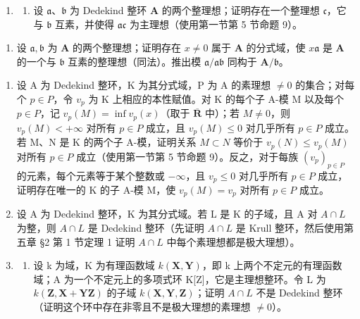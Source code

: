 \begin{enumerate}
\def\labelenumi{\arabic{enumi}.}
\setcounter{enumi}{1}
\tightlist
\item
  \begin{enumerate}
  \def\labelenumii{(\alph{enumii})}
  \tightlist
  \item
    设 \(\mathfrak{a}\)、\(\mathfrak{b}\) 为 Dedekind 整环 \(\mathbf{A}\) 的两个整理想；证明存在一个整理想 \(\mathfrak{c}\)，它与 \(\mathfrak{b}\) 互素，并使得 \(\mathfrak{ac}\) 为主理想（使用第一节第 5 节命题 9）。
  \end{enumerate}
\end{enumerate}

\begin{enumerate}
\def\labelenumi{(\alph{enumi})}
\setcounter{enumi}{1}
\tightlist
\item
  设 \(\mathfrak{a}, \mathfrak{b}\) 为 \(\mathbf{A}\) 的两个整理想；证明存在 \(x \neq 0\) 属于 \(\mathbf{A}\) 的分式域，使 \(x\mathfrak{a}\) 是 \(\mathbf{A}\) 的一个与 \(\mathfrak{b}\) 互素的整理想（同法）。推出模 \(\mathfrak{a}/\mathfrak{ab}\) 同构于 \(\mathbf{A}/\mathfrak{b}\)。
\end{enumerate}

\begin{enumerate}
\def\labelenumi{\arabic{enumi}.}
\setcounter{enumi}{2}
\item
  设 A 为 Dedekind 整环，K 为其分式域，P 为 A 的素理想 \(\neq 0\) 的集合；对每个 \(p \in P\)，令 \(v_{p}\) 为 K 上相应的本性赋值。对 K 的每个子 A-模 M 以及每个 \(p \in P\)，记 \(v_{p}(M) = \inf v_{p}(x)\)（取于 \(\overline{\mathbf{R}}\) 中）；若 \(M \neq 0\)，则 \(v_{p}(M) < +\infty\) 对所有 \(p \in P\) 成立，且 \(v_{p}(M) \leqslant 0\) 对几乎所有 \(p \in P\) 成立。若 M、N 是 K 的两个子 A-模，证明关系 \(M \subset N\) 等价于 \(v_{p}(N) \leqslant v_{p}(M)\) 对所有 \(p \in P\) 成立（使用第一节第 5 节命题 9）。反之，对于每族 \((v_{p})_{p \in P}\) 的元素，每个元素等于某个整数或 \(-\infty\)，且 \(v_{p} \leqslant 0\) 对几乎所有 \(p \in P\) 成立，证明存在唯一的 K 的子 A-模 M，使 \(v_{p}(M) = v_{p}\) 对所有 \(p \in P\) 成立。
\item
  设 A 为 Dedekind 整环，K 为其分式域。若 L 是 K 的子域，且 A 对 \(A \cap L\) 为整，则 \(A \cap L\) 是 Dedekind 整环（先证明 \(A \cap L\) 是 Krull 整环，然后使用第五章 §2 第 1 节定理 1 证明 \(A \cap L\) 中每个素理想都是极大理想）。
\item
  \begin{enumerate}
  \def\labelenumii{(\alph{enumii})}
  \tightlist
  \item
    设 k 为域，K 为有理函数域 \(k(\mathbf{X}, \mathbf{Y})\)，即 k 上两个不定元的有理函数域；A 为一个不定元上的多项式环 K{[}Z{]}，它是主理想整环。令 L 为 \(k(\mathbf{Z}, \mathbf{X} + \mathbf{Y}\mathbf{Z})\) 的子域 \(k(\mathbf{X}, \mathbf{Y}, \mathbf{Z})\)；证明 \(A \cap L\) 不是 Dedekind 整环（证明这个环中存在非零且不是极大理想的素理想 \(\neq 0\)）。
  \end{enumerate}
\end{enumerate}

